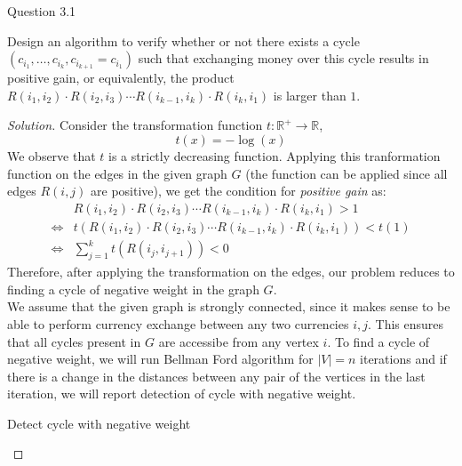 \begin{solution}{Question 3.1}\label{sol:31}
    \begin{question}
        Design an algorithm to verify whether or not there exists a cycle $(c_{i_1}, \ldots, c_{i_k}, c_{i_{k+1}} = c_{i_1})$ such that exchanging money over this cycle results in positive gain, or equivalently, the product $R(i_1, i_2)\cdot R(i_2, i_3)\cdots R(i_{k-1}, i_k)\cdot R(i_k, i_1)$ is larger than $1$.
    \end{question}
    \tcblower{}
    \begin{proof}[Solution]
        Consider the transformation function $t:\mathbb{R}^{+}\to\mathbb{R}$,
        \begin{equation}
            t(x)=-\log(x)
        \end{equation}
        We observe that $t$ is a strictly decreasing function. Applying this tranformation function on the edges in the given graph $G$ (the function can be applied since all edges $R(i, j)$ are positive), we get the condition for \textit{positive gain} as:
        \begin{equation}
            \begin{split}
                &R(i_1, i_2)\cdot R(i_2, i_3)\cdots R(i_{k-1}, i_k)\cdot R(i_k, i_1) > 1\\
                \iff&t(R(i_1, i_2)\cdot R(i_2, i_3)\cdots R(i_{k-1}, i_k)\cdot R(i_k, i_1)) < t(1)\\
                \iff&\sum_{j=1}^k{t(R(i_j, i_{j+1}))} < 0
            \end{split}
        \end{equation}
        Therefore, after applying the transformation on the edges, our problem reduces to finding a cycle of negative weight in the graph $G$.\\
        We assume that the given graph is strongly connected, since it makes sense to be able to perform currency exchange between any two currencies $i, j$. This ensures that all cycles present in $G$ are accessibe from any vertex $i$. To find a cycle of negative weight, we will run Bellman Ford algorithm for $|V|=n$ iterations and if there is a change in the distances between any pair of the vertices in the last iteration, we will report detection of cycle with negative weight.\\
        \begin{algorithm}[H]
            \caption{Detect cycle with negative weight}\label{alg:cycle}
            \begin{algorithmic}[1]

\end{algorithmic}
\end{algorithm}
\end{proof}
\end{solution}
